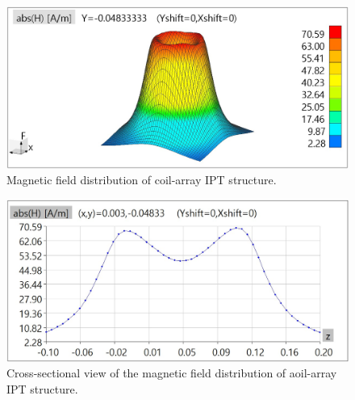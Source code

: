 \begin{figure}[!b]
    \centering
    \includegraphics[width=0.9\linewidth]{images/4_coil_array_near_field_distribution.JPG}
    \caption{Magnetic field distribution of coil-array IPT structure.}
    \label{fig: magnetic distribution of coil array}
\end{figure}

\begin{figure}[!t]
    \centering
    \includegraphics[width=0.9\linewidth]{images/4_coil_array_near_field_distribution_cut.JPG}
    \caption{Cross-sectional view of the magnetic field distribution of aoil-array IPT structure.}
    \label{fig: magnetic distribution of coil array cut}
\end{figure}

